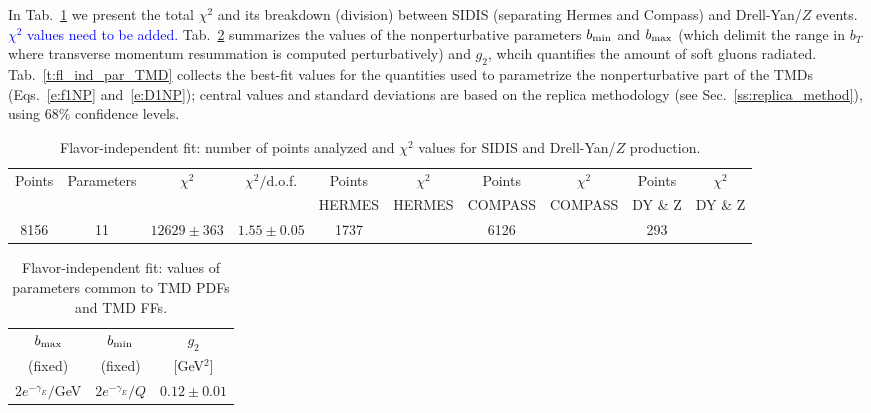 \documentclass[aps,preprintnumbers,showpacs,nofootinbib,superscriptaddress,floatfix]{revtex4}
\begin{document}
In Tab.~\ref{t:fl_ind_chi2} we present the total $\chi^2$ and its breakdown (division) between SIDIS (separating Hermes and Compass) and Drell-Yan/$Z$ events. \textcolor{blue}{$\chi^2$ values need to be added.} 
Tab.~\ref{t:fl_ind_parcommon} summarizes the values of the nonperturbative parameters $b_{\rm min}$ and $b_{\rm max}$ (which delimit the range in $b_T$ where transverse momentum resummation is computed perturbatively) and $g_2$, whcih quantifies the amount of soft gluons radiated.
Tab.~\ref{t:fl_ind_par_TMD} collects the best-fit values for the quantities used to parametrize the nonperturbative part of the TMDs (Eqs.~\eqref{e:f1NP} and~\eqref{e:D1NP}); central values and standard deviations are based on the replica methodology (see Sec.~\ref{ss:replica_method}), using $68\%$ confidence levels.

\begin{table}[h!]
\small
  \centering
  \begin{tabular}{|c|c|c|c|c|c|c|c|c|c|}
\hline
\hline
Points& Parameters & $\chi^2$& $\chi^2/$d.o.f.& 
                  Points &$\chi^2$& Points &$\chi^2$& Points &$\chi^2$ 
 \\ 
      &    &    &  & HERMES    & HERMES   & COMPASS & COMPASS & DY \& Z & DY \& Z  \\
\hline
8156 & 11  & $12629 \pm 363$ & $1.55 \pm 0.05$ & 1737&  &6126 & & 293 &    \\
\hline
\hline
\end{tabular}
\caption{Flavor-independent fit: number of points analyzed and $\chi^2$ values for SIDIS and Drell-Yan/$Z$ production.}
\label{t:fl_ind_chi2}
\end{table}
\begin{table}[h!]
\small
  \centering
  \begin{tabular}{|c|c|c|}
\hline
\hline
$b_{\rm max}$ & $b_{\rm min}$ &  $g_2$ 
 \\ 
 (fixed)     & (fixed)   & {[GeV$^2$]}                           \\
\hline
$2 e^{-\gamma_E}/$GeV& $2 e^{-\gamma_E}/Q$  & $0.12 \pm 0.01$  \\
\hline
\hline
\end{tabular}
\caption{Flavor-independent fit: values of parameters common to TMD PDFs and TMD FFs.}
\label{t:fl_ind_parcommon}
\end{table}
\end{document}
